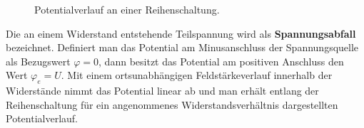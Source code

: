 \begin{figure}[H]
\centering
\caption{Potentialverlauf an einer Reihenschaltung.}
\label{fig_IIIn}
\end{figure}
\noindent Die an einem Widerstand entstehende Teilspannung wird als \textbf{Spannungsabfall} bezeichnet. Definiert man das Potential am Minusanschluss der Spannungsquelle als Bezugswert $\varphi=0$, dann besitzt das Potential am positiven Anschluss den Wert $\varphi_e=U$. Mit einem ortsunabhängigen Feldstärkeverlauf innerhalb der Widerstände nimmt das Potential linear ab und man erhält entlang der Reihenschaltung für ein angenommenes Widerstandsverhältnis dargestellten Potentialverlauf.
